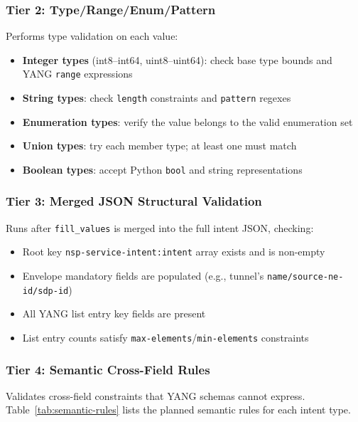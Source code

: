 \documentclass[12pt, a4paper]{article}
\newcommand{\yang}{\textsc{YANG}}
\newcommand{\fillvalues}{\texttt{fill\_values}}
\begin{document}
\subsubsection{Tier 2: Type/Range/Enum/Pattern}

Performs type validation on each value:

\begin{itemize}
  \item \textbf{Integer types} (int8--int64, uint8--uint64): check base type bounds and \yang{} \texttt{range} expressions
  \item \textbf{String types}: check \texttt{length} constraints and \texttt{pattern} regexes
  \item \textbf{Enumeration types}: verify the value belongs to the valid enumeration set
  \item \textbf{Union types}: try each member type; at least one must match
  \item \textbf{Boolean types}: accept Python \texttt{bool} and string representations
\end{itemize}

\subsubsection{Tier 3: Merged JSON Structural Validation}

Runs after \fillvalues{} is merged into the full intent JSON, checking:

\begin{itemize}
  \item Root key \texttt{nsp-service-intent:intent} array exists and is non-empty
  \item Envelope mandatory fields are populated (e.g., tunnel's \texttt{name/source-ne-id/sdp-id})
  \item All \yang{} list entry key fields are present
  \item List entry counts satisfy \texttt{max-elements}/\texttt{min-elements} constraints
\end{itemize}

\subsubsection{Tier 4: Semantic Cross-Field Rules}

Validates cross-field constraints that \yang{} schemas cannot express. Table~\ref{tab:semantic-rules} lists the planned semantic rules for each intent type.
\end{document}
